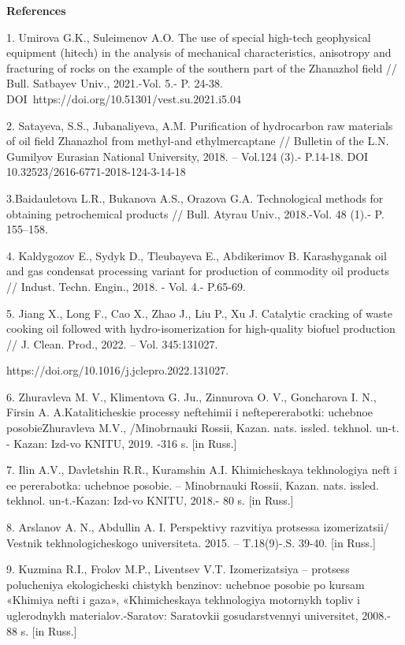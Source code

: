 \begin{center}
{\bfseries References}
\end{center}

\begin{noparindent}
1. Umirova G.K., Suleimenov A.O. The use of special high-tech
geophysical equipment (hitech) in the analysis of mechanical
characteristics, anisotropy and fracturing of rocks on the example of
the southern part of the Zhanazhol field // Bull. Satbayev Univ.,
2021.-Vol. 5.- P. 24-38. DOI~https://doi.org/10.51301/vest.su.2021.i5.04

2. Satayeva, S.S., Jubanaliyeva, A.M. Purification of hydrocarbon raw
materials of oil field Zhanazhol from methyl-and ethylmercaptane //
Bulletin of the L.N. Gumilyov Eurasian National University, 2018. --
Vol.124 (3).- P.14-18. DOI 10.32523/2616-6771-2018-124-3-14-18

3.Baidauletova L.R., Bukanova A.S., Orazova G.A. Technological methods
for obtaining petrochemical products // Bull. Atyrau Univ., 2018.-Vol.
48 (1).- P. 155--158.

4. Kaldygozov E., Sydyk D., Tleubayeva E., Abdikerimov B. Karashyganak
oil and gas condensat processing variant for production of commodity oil
products // Indust. Techn. Engin., 2018. - Vol. 4.- P.65-69.

5. Jiang X., Long F., Cao X., Zhao J., Liu P., Xu J. Catalytic cracking
of waste cooking oil followed with hydro-isomerization for high-quality
biofuel production // J. Clean. Prod., 2022. -- Vol. 345:131027.

https://doi.org/10.1016/j.jclepro.2022.131027.

6. Zhuravleva M. V., Klimentova G. Ju., Zinnurova O. V., Goncharova I.
N., Firsin A. A.Kataliticheskie processy neftehimii i neftepererabotki:
uchebnoe posobieZhuravleva M.V., /Minobrnauki Rossii, Kazan. nats.
issled. tekhnol. un-t. - Kazan\textquotesingle: Izd-vo KNITU, 2019. -316
s. {[}in Russ.{]}

7. Il\textquotesingle in A.V., Davletshin R.R., Kuramshin A.I.
Khimicheskaya tekhnologiya neft\textquotesingle{} i ee pererabotka:
uchebnoe posobie. -- Minobrnauki Rossii, Kazan. nats. issled. tekhnol.
un-t.-Kazan\textquotesingle: Izd-vo KNITU, 2018.- 80 s. {[}in Russ.{]}

8. Arslanov A. N., Abdullin A. I. Perspektivy razvitiya protsessa
izomerizatsii/ Vestnik tekhnologicheskogo universiteta. 2015. --
T.18(9)-.S. 39-40. {[}in Russ.{]}

9. Kuz\textquotesingle mina R.I., Frolov M.P., Liventsev V.T.
Izomerizatsiya -- protsess polucheniya ekologicheski chistykh benzinov:
uchebnoe posobie po kursam «Khimiya nefti i gaza», «Khimicheskaya
tekhnologiya motornykh topliv i uglerodnykh materialov.-Saratov:
Saratovkii gosudarstvennyi universitet, 2008.- 88 s. {[}in Russ.{]}


\end{noparindent}
